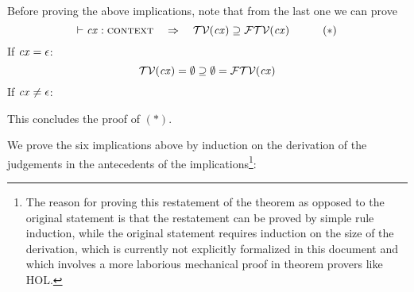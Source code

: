 Before proving the above implications, note that from the last one we can
prove
\[
\cxwfO\ \ \IMPLIES\ \ \cxtvarO\supseteq\ftvar{\cx}
\hspace{3em}(*)
\]
If $\mathit{cx}=\epsilon$:
\[
\mathcal{TV}(\mathit{cx})=\emptyset\supseteq\emptyset=\mathcal{FTV}(\mathit{cx})
\]
If $\mathit{cx}\neq\epsilon$:
\begin{derivation}
\steP
{\cxtvarO
 \link{\supseteq}{\hyp}
 \ftvar{\cx}}
\end{derivation}
This concludes the proof of $(*)$.

We prove the six implications above by induction on the derivation of the
judgements in the antecedents of the implications\footnote{The reason for
proving this restatement of the theorem as opposed to the original statement
is that the restatement can be proved by simple rule induction, while the
original statement requires induction on the size of the derivation, which is
currently not explicitly formalized in this document and which involves a more
laborious mechanical proof in theorem provers like HOL.}:

